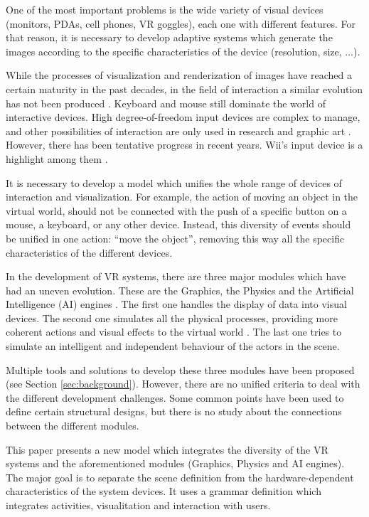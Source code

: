 \documentclass[12pt]{article}
\begin{document}
One of the most important problems is the wide variety of visual devices (monitors, PDAs, cell
phones, VR goggles), each one with different features. For that reason, it is necessary to develop
adaptive systems which generate the images according to the specific characteristics of the device
(resolution, size, ...).

While the processes of visualization and renderization of images have reached a certain maturity in
the past decades, in the field of interaction a similar evolution has not been produced
\cite{Joshua2004,David2005}. Keyboard and mouse still dominate the world of interactive devices.
High degree-of-freedom input devices are complex to manage, and other possibilities of interaction
are only used in research and graphic art \cite{Joshua2004}. However, there has been tentative
progress in recent years. Wii's input device is a highlight among them \cite{wiiNintendo}.

It is necessary to develop a model which unifies the whole range of devices of interaction and
visualization. For example, the action of moving an object in the virtual world, should not be
connected with the push of a specific button on a mouse, a keyboard, or any other device. Instead,
this diversity of events should be unified in one action: ``move the object'', removing this way
all the specific characteristics of the different devices.

In the development of VR systems, there are three major modules which have had an uneven evolution.
These are the Graphics, the Physics and the Artificial Intelligence (AI) engines \cite{Burdea2003}.
The first one handles the display of data into visual devices. The second one simulates all the
physical processes, providing more coherent actions and visual effects to the virtual world \cite{Wikipedia2007}.
The last one tries to simulate an intelligent and independent behaviour of the actors in the scene.

Multiple tools and solutions to develop these three modules have been proposed (see Section
\ref{sec:background}). However, there are no unified criteria to deal with the different
development challenges. Some common points have been used to define certain structural designs, but
there is no study about the connections between the different modules.

This paper presents a new model which integrates the diversity of the VR systems and the
aforementioned modules (Graphics, Physics and AI engines). The major goal is to
separate the scene definition from the hardware-dependent characteristics of the system devices. It
uses a grammar definition which integrates activities, visualitation and interaction with users.
\end{document}
